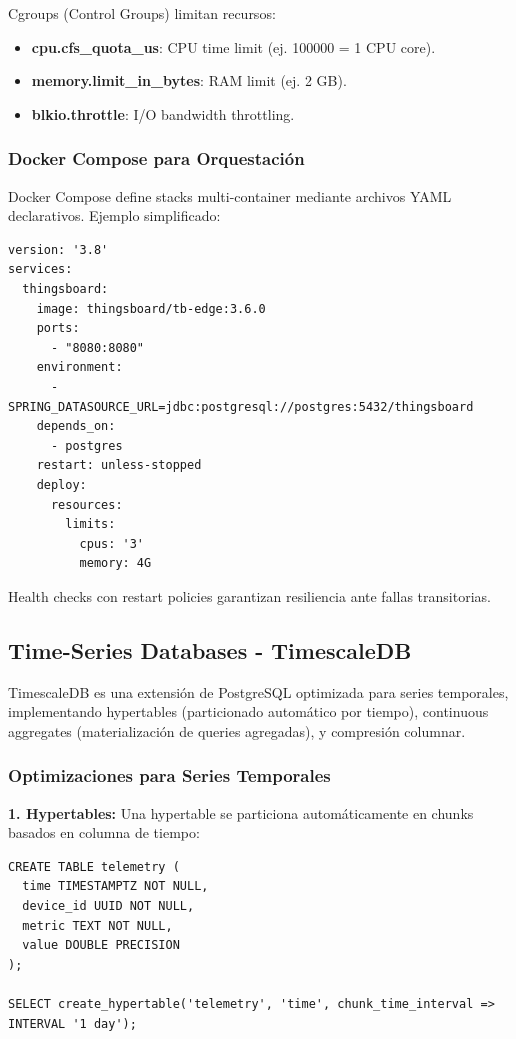 Cgroups (Control Groups) limitan recursos:
\begin{itemize}
\item \textbf{cpu.cfs\_quota\_us}: CPU time limit (ej. 100000 = 1 CPU core).
\item \textbf{memory.limit\_in\_bytes}: RAM limit (ej. 2 GB).
\item \textbf{blkio.throttle}: I/O bandwidth throttling.
\end{itemize}

\subsubsection{Docker Compose para Orquestación}

Docker Compose define stacks multi-container mediante archivos YAML declarativos. Ejemplo simplificado:

\begin{verbatim}
version: '3.8'
services:
  thingsboard:
    image: thingsboard/tb-edge:3.6.0
    ports:
      - "8080:8080"
    environment:
      - SPRING_DATASOURCE_URL=jdbc:postgresql://postgres:5432/thingsboard
    depends_on:
      - postgres
    restart: unless-stopped
    deploy:
      resources:
        limits:
          cpus: '3'
          memory: 4G
\end{verbatim}

Health checks con restart policies garantizan resiliencia ante fallas transitorias.

\subsection{Time-Series Databases - TimescaleDB}

TimescaleDB es una extensión de PostgreSQL optimizada para series temporales, implementando hypertables (particionado automático por tiempo), continuous aggregates (materialización de queries agregadas), y compresión columnar.

\subsubsection{Optimizaciones para Series Temporales}

\textbf{1. Hypertables:} Una hypertable se particiona automáticamente en chunks basados en columna de tiempo:

\begin{verbatim}
CREATE TABLE telemetry (
  time TIMESTAMPTZ NOT NULL,
  device_id UUID NOT NULL,
  metric TEXT NOT NULL,
  value DOUBLE PRECISION
);

SELECT create_hypertable('telemetry', 'time', chunk_time_interval => INTERVAL '1 day');
\end{verbatim}

